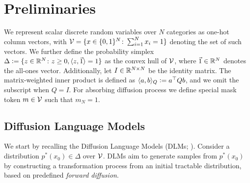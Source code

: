 \vspace{-2mm}
\section{Preliminaries}
\vspace{-2mm}
  We represent scalar discrete random variables over $N$ categories as one-hot column vectors, with ${\mathcal{V} = \{x \in \{0,1\}^N \colon \sum_{i=1}^N x_i = 1\}}$ denoting the set of such vectors. We further define the probability simplex $\Delta \vcentcolon= \{ z \in \mathbb{R}^N\colon z \ge 0, \langle z, \vec{1} \rangle = 1 \}$ as the convex hull of $\mathcal{V}$, where $\vec{1} \in \mathbb{R}^N$ denotes the all-ones vector. Additionally, let $I \in \mathbb{R}^{N \times N}$ be the identity matrix. The matrix-weighted inner product is defined as $\langle a, b \rangle_Q \vcentcolon= a^\top Q b$, and we omit the subscript when $Q = I$. For absorbing diffusion process we define special mask token $m \in \mathcal{V}$ such that $m_N = 1$.

\vspace{-2mm}
\subsection{Diffusion Language Models}
\label{sec:discrete diffusion models}
\vspace{-2mm}
  We start by recalling the Diffusion Language Models (DLMs; \citealp{austin2021structured, campbell2022continuous, lou2024discrete}). Consider a distribution $p^*(x_0) \in \Delta$ over $\mathcal{V}$. DLMs aim to generate samples from $p^*(x_0)$ by constructing a transformation process from an initial tractable distribution, based on predefined \textit{forward diffusion}.


